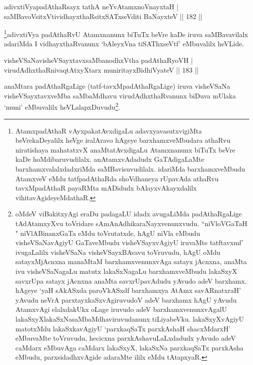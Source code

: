 
\begin{shl}
adivxtiVyapadAthaRsayx tathA neYvA\s \s tamxnoV\s nayxtaH |\\
saMBavoV\s sitxVtividhayxthaRsitxSATxseVditi BaNayxteV \hfill || 182 ||
\end{shl}

\begin{artha}
\footnote{AtamxpadAthaR vAyxpakatAvxdigaLu adavxyavasutxvigiMta beVrekaDeyalilx heVge iralAravo hAgeye barxhamxveMbudara athaRvu niratishaya mahatatxvX anaMtatAvxdigaLu Atamxnanunx biTuTx beVre kaDe hoMdibaruvudilalx. anAtamxvAdadudx GaTAdigaLaMte barxhamxvalalxdadxriMda saMBavisuvudilalx. idariMda barxhamxveMbudu  AtamxveV eMdu tatfpadAthaRda shoVdhaneya rUpavAda athaRvu tavxMpadAthaR payaRMta mADidudx bAlayxvAkayxdalilx vihitavAgideyeMdathaR.}adivxtiVya padAthaRvU Atamxnanunx biTuTx beVre kaDe iruva saMBavavilalx adariMda I vidhayxthaRvanunx `bAleyxVna tiSAThxseVtf' eMbuvalilx heVLide.
\end{artha}


\begin{shl}
visheVSaNavisheVSayxtavxsaMbanodhxV\s tha padAthaRyoVH |\\
virudAdhxthaRnivaqtAtxyX\s tarx muniritayxBidhiVyateV \hfill || 183 ||
\end{shl}

\begin{artha}
anaMtara padAthaRgaLige (tatf-tavxMpadAthaRgaLige) iruva visheVSaNa visheVSayxtavxveMba saMbaMdhavu virudAdhxthaRvanunx biDuva mUlaka `muni' eMbuvalilx heVLalapxDuvudu\footnote{oMdeV viBakitxyAgi eraDu padagaLU idadx avugaLiMda padAthaRgaLige tAdAtamxyXvu toVridare sAmAnAdhikaraNayxvenunxvudu. ``niVloVGaTaH " niVlABinanxGaTa eMdu toVrutatxde, hAgU niVla eMbudu visheVSaNavAgiyU GaTaveMbudu visheVSayxvAgiyU iruvaMte tatftavxmf' ivugaLalilx visheVSaNa visheVSayxBAvavu toVruvudu, hAgU oMdu satayxMjAcnxna manaMtaM barxhamxvenunxvAga satayx jAcnxna, anaMta ivu visheVSaNagaLu matutx lakaSxNagaLu barxhamxveMbudu lakaSxyX savxrUpa satayx jAcnxna anaMta savxrUpavAdudu yAvudo adeV barxhamx. hAgeye `yaH sAkASxda paroVkASxdf barxhamxya AtAmx savARnatxraH' yAvudu neVrA parxtayxkaSxvAgiruvudoV adeV barxhamx hAgU yAvudu AtamxvAgi elalxdakUkx oLage iruvudo adeV barxhamxvenunxvAgalU lakaSxyXlakaSxNasaMbaMdhaviruvudanunx tiLiyabeVku. lakaSxyXvAgiyU matotxMdu lakaSxkavAgiyU `parxkaqSaTx parxkAshaH shacxMdarxH' eMbuvaMte toVruvudu, hecicxna parxkAshavuLaLxdadudx yAvudo adeV caMdarx eMbuvAga caMdarx lakaSxyX, lakaSxNa parxkaqSaTx parxkAsha eMbudu, parxsidadhxvAgide adaraMte ililx eMdu tAtapxyaR.}.
\end{artha}

